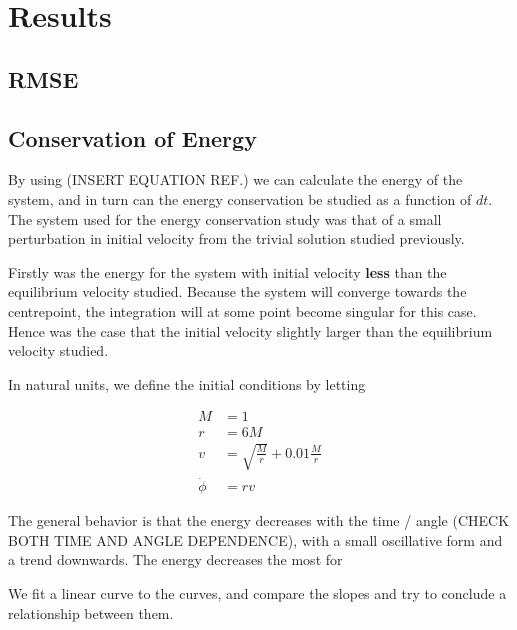 \section{Results}\label{sec:results}

\subsection{RMSE}

\subsection{Conservation of Energy}\label{sec:energy_conservation}

By using (INSERT EQUATION REF.) %
we can calculate the energy of the system, and in turn can the energy conservation be studied as a function of $dt$. The system used for the energy conservation study was that of a small perturbation in initial velocity from the trivial solution studied previously. 

Firstly was the energy for the system with initial velocity \textbf{less} than the equilibrium velocity studied. Because the system will converge towards the centrepoint, the integration will at some point become singular for this case. Hence was the case that the initial velocity slightly larger than the equilibrium velocity studied. 

In natural units, we define the initial conditions by letting

\begin{align}
	M &= 1 \\
	r &= 6M \\
	v &= \sqrt{\frac{M}{r}} + 0.01 \frac{M}{r} \\
	\dot{\phi} &= rv
\end{align}



The general behavior is that the energy decreases with the time / angle (CHECK BOTH TIME AND ANGLE DEPENDENCE), with a small oscillative form and a trend downwards. The energy decreases the most for 

We fit a linear curve to the curves, and compare the slopes and try to conclude a relationship between them. 

